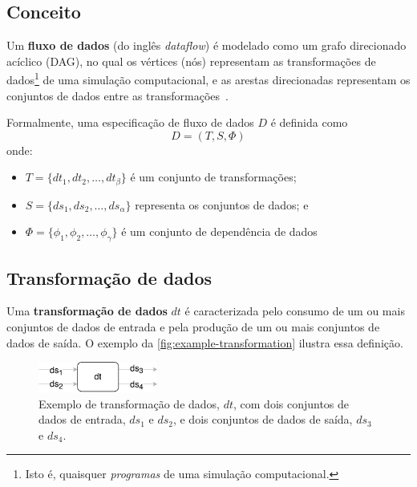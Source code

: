 
\subsection{Conceito}

Um \textbf{fluxo de dados} (do inglês \textit{dataflow}) é modelado como um grafo direcionado acíclico (DAG), no qual os vértices (nós) representam as transformações de dados\footnote{Isto é, quaisquer \emph{programas} de uma simulação computacional.} de uma simulação computacional, e as arestas direcionadas representam os conjuntos de dados entre as transformações~\cite{silva2017raw}.

Formalmente, uma especificação de fluxo de dados \( D \) é definida como \[ D = (T, S, \Phi) \] onde:
\begin{itemize}
    \item \( T = \{dt_1, dt_2, \ldots, dt_{\beta}\} \) é um conjunto de transformações;
    \item \( S = \{ds_1, ds_2, \ldots, ds_{\alpha}\} \) representa os conjuntos de dados; e
    \item \( \Phi = \{\phi_1, \phi_2, \ldots, \phi_{\gamma}\} \) é um conjunto de dependência de dados
\end{itemize}

\subsection{Transformação de dados}

Uma \textbf{transformação de dados} \( dt \) é caracterizada pelo consumo de um ou mais conjuntos de dados de entrada e pela produção de um ou mais conjuntos de dados de saída. O exemplo da \autoref{fig:example-transformation} ilustra essa definição.

\begin{figure}[htb]
    \centering
    \includegraphics[width=0.35\textwidth]{img/example-data-transformation}
    \caption[Exemplo de transformação de dados]{Exemplo de transformação de dados, \( dt \), com dois conjuntos de dados de entrada, \( ds_1 \) e \( ds_2 \), e dois conjuntos de dados de saída, \( ds_3 \) e \( ds_4 \).}%
    \label{fig:example-transformation}
\end{figure}

